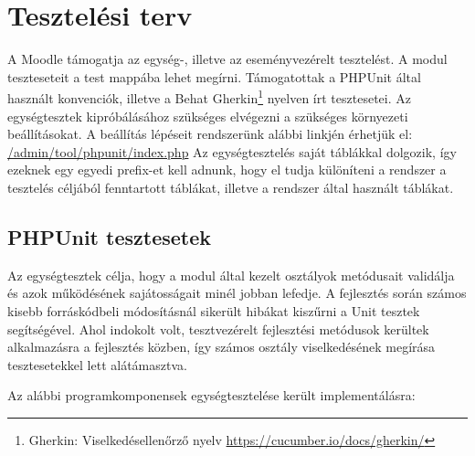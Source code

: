 \section{Tesztelési terv}

A Moodle támogatja az egység-, illetve az eseményvezérelt tesztelést. A modul teszteseteit a test mappába lehet megírni. Támogatottak a PHPUnit által használt konvenciók, illetve a Behat Gherkin\footnote{Gherkin: Viselkedésellenőrző nyelv \url{https://cucumber.io/docs/gherkin/}} nyelven írt tesztesetei. Az egységtesztek kipróbálásához szükséges elvégezni a szükséges környezeti beállításokat. A beállítás lépéseit rendszerünk alábbi linkjén érhetjük el: \url{/admin/tool/phpunit/index.php}  Az egységtesztelés saját táblákkal dolgozik, így ezeknek egy egyedi prefix-et kell adnunk, hogy el tudja különíteni a rendszer a tesztelés céljából fenntartott táblákat, illetve a rendszer által használt táblákat.

\subsection{PHPUnit tesztesetek}

Az egységtesztek célja, hogy a modul által kezelt osztályok metódusait validálja és azok működésének sajátosságait minél jobban lefedje. A fejlesztés során számos kisebb forráskódbeli módosításnál sikerült hibákat kiszűrni a Unit tesztek segítségével. Ahol indokolt volt, tesztvezérelt fejlesztési metódusok kerültek alkalmazásra a fejlesztés közben, így számos osztály viselkedésének megírása tesztesetekkel lett alátámasztva.

Az alábbi programkomponensek egységtesztelése került implementálásra:

